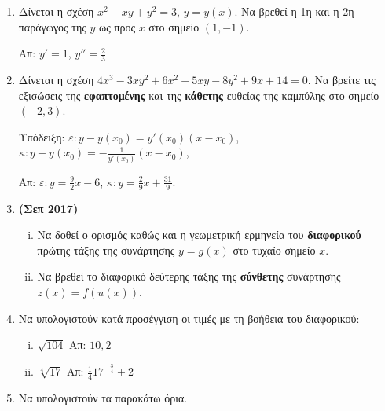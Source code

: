 \begin{enumerate}
  \item Δίνεται η σχέση $ x^{2} - xy + y^{2} = 3 $, $ y=y(x) $. Να βρεθεί η 1η
    και η 2η παράγωγος της $y$ ως προς $x$ στο σημείο $ (1,-1) $.

    \hfill Απ: $ y' = 1$, $ y'' = \frac{2}{3} $

  \item Δίνεται η σχέση $ 4x^{3} - 3xy^{2} + 6x^{2} - 5xy - 8 y^{2} + 9x + 14
    = 0$. Να βρείτε τις εξισώσεις της \textbf{εφαπτομένης} και της \textbf{κάθετης} 
    ευθείας της καμπύλης στο σημείο $ (-2,3) $.

    \textcolor{Col1}{Υπόδειξη:} 
      $ \varepsilon: y-y(x_{0}) = y'(x_{0})(x- x_{0}) $, \;
      $ \kappa: y-y(x_{0}) = -\frac{1}{y'(x_{0})}(x- x_{0}) $, \;

    \hfill Απ: $\varepsilon\colon y = \frac{9}{2} x - 6 $, 
    $\kappa\colon y = \frac{2}{9} x + \frac{31}{9} $.

  \item {\bfseries (Σεπ 2017)}
    \begin{enumerate}[i)]
      \item Να δοθεί ο ορισμός καθώς και η γεωμετρική
        ερμηνεία του \textbf{διαφορικού} πρώτης τάξης της συνάρτησης $ y = g(x) $ στο
        τυχαίο σημείο $x$. 
      \item Να βρεθεί το διαφορικό δεύτερης τάξης της \textbf{σύνθετης} συνάρτησης 
        $ z(x) = f(u(x))	$.
    \end{enumerate}

  \item Να υπολογιστούν κατά προσέγγιση οι τιμές με τη βοήθεια του διαφορικού:
    \begin{enumerate}[i)]
      \item $\sqrt{104}$ \hfill Απ: $10,2$
      \item $\sqrt[4]{17}$ \hfill Απ: $\frac{1}{4}17^{-\frac{3}{4}}+2$
    \end{enumerate}

  \item Να υπολογιστούν τα παρακάτω όρια.
    \begin{enumerate}[(i)]
    \end{enumerate}


\end{enumerate}
